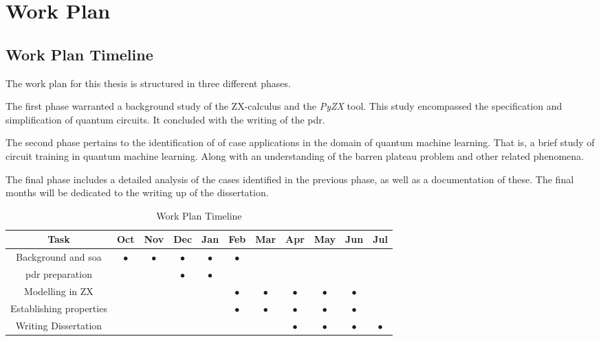 \chapter{Work Plan}

\section{Work Plan Timeline}



The work plan for this thesis is structured in three different phases. 

The first phase warranted a background study of the ZX-calculus and the \textit{PyZX} tool. This study encompassed the specification and simplification of quantum circuits. It concluded with the writing of the \acrshort{pdr}.

The second phase pertains to the identification of of case applications in the domain of quantum machine learning. That is, a brief study of circuit training in quantum machine learning. Along with an understanding of the barren plateau problem and other related phenomena.

The final phase includes a detailed analysis of the cases identified in the previous phase, as well as a documentation of these. The final months will be dedicated to the writing up of the dissertation.


\begin{table}[H]
\begin{center}
\begin{tabular}{| c | c | c | c | c | c | c | c | c | c | c |}
\hline
\textbf{Task} & \textbf{Oct} & \textbf{Nov} & \textbf{Dec} & \textbf{Jan} & \textbf{Feb} & \textbf{Mar} & \textbf{Apr} & \textbf{May} & \textbf{Jun} & \textbf{Jul}\\
\hline
Background and \acrshort{soa} & $\bullet$ & $\bullet$ & $\bullet$ &$\bullet$ &$\bullet$ & & & & & \\
\hline
\acrshort{pdr} preparation & &  & $\bullet$ & $\bullet$ & & & & & & \\
\hline
Modelling in ZX & & & & &$\bullet$ &$\bullet$ &$\bullet$ &$\bullet$ &$\bullet$ & \\
\hline
Establishing properties & & & & &$\bullet$ &$\bullet$ &$\bullet$ &$\bullet$ &$\bullet$ & \\
\hline
Writing Dissertation & & & & & & & $\bullet$ & $\bullet$ & $\bullet$ & $\bullet$ \\
\hline
\end{tabular}
\end{center}
\caption{Work Plan Timeline}
\end{table}



